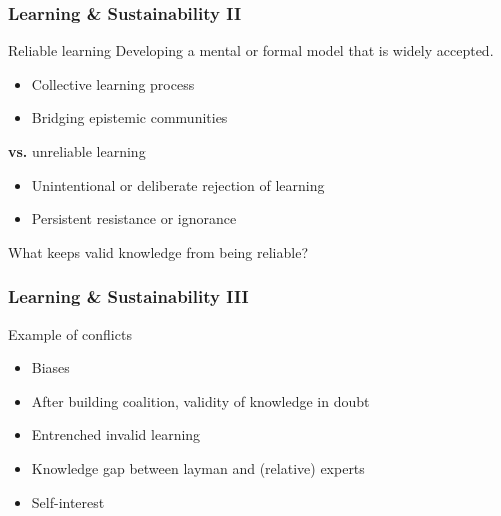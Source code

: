 
\begin{frame}
	\frametitle{Learning \& Sustainability II}
	\begin{block}{Reliable learning}
		Developing a mental or formal model that is widely accepted.

		\hrulefill

		\begin{itemize}
			\item Collective learning process \citep{Wright2017}
			\item Bridging epistemic communities \citep{Aronczyk2019}
		\end{itemize}
		\centering \textbf{vs.} unreliable learning
		\vspace{5pt}
		\begin{itemize}
			\item Unintentional or deliberate rejection of learning \citep{Hermwille2019,Koontz2018}
			\item Persistent resistance or ignorance \citep{Boudet2020}
		\end{itemize}
	\end{block}
\end{frame}

\blackgroup
	\begin{frame}[plain]
		What keeps valid knowledge from being reliable?
	\end{frame}
\egroup

\begin{frame}
	\frametitle{Learning \& Sustainability III}
	\begin{block}{Example of conflicts}
		\begin{itemize}
			\item Biases \citep[e.g.,][]{Makov2016}
			\item After building coalition, validity of knowledge in doubt \citep[e.g.,][]{Aronczyk2019,Wright2017}
			\item Entrenched invalid learning \citep[e.g.,][]{Boudet2020}
			\item Knowledge gap between layman and (relative) experts \citep[e.g.,][]{Camilleri2019}
			\item Self-interest \citep{Rerup2021}
		\end{itemize}
	\end{block}
\end{frame}

